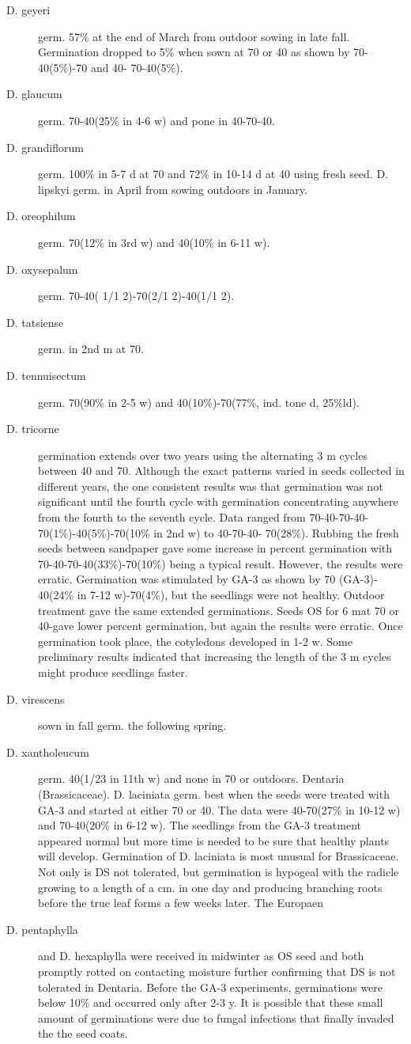 \begin{description}
\item[D. geyeri] germ. 57\% at the end of March from outdoor sowing in late fall.
Germination dropped to 5\% when sown at 70 or 40 as shown by 70-40(5\%)-70 and 40-
70-40(5\%).
\item[D. glaucum] germ. 70-40(25\% in 4-6 w) and pone in 40-70-40.
\item[D. grandiflorum] germ. 100\% in 5-7 d at 70 and 72\% in 10-14 d at 40 using fresh
seed. D. lipskyi germ. in April from sowing outdoors in January.
\item[D. oreophilum] germ. 70(12\% in 3rd w) and 40(10\% in 6-11 w).
\item[D. oxysepalum] germ. 70-40( 1/1 2)-70(2/1 2)-40(1/1 2).
\item[D. tatsiense] germ. in 2nd m at 70.
\item[D. tennuisectum] germ. 70(90\% in 2-5 w) and 40(10\%)-70(77\%, ind. tone d,
25\%ld).
\item[D. tricorne] germination extends over two years using the alternating 3 m cycles
between 40 and 70. Although the exact patterns varied in seeds collected in different
years, the one consistent results was that germination was not significant until the
fourth cycle with germination concentrating anywhere from the fourth to the seventh
cycle. Data ranged from 70-40-70-40-70(1\%)-40(5\%)-70(10\% in 2nd w) to 40-70-40-
70(28\%). Rubbing the fresh seeds between sandpaper gave some increase in
percent germination with 70-40-70-40(33\%)-70(10\%) being a typical result. However,
the results were erratic. Germination was stimulated by GA-3 as shown by 70 (GA-3)-
40(24\% in 7-12 w)-70(4\%), but the seedlings were not healthy. Outdoor treatment
gave the same extended germinations. Seeds OS for 6 mat 70 or 40-gave lower
percent germination, but again the results were erratic. Once germination took place,
the cotyledons developed in 1-2 w. Some preliminary results indicated that increasing
the length of the 3 m cycles might produce seedlings faster.
\item[D. virescens] sown in fall germ. the following spring.
\item[D. xantholeucum] germ. 40(1/23 in 11th w) and none in 70 or outdoors.
Dentaria (Brassicaceae). D. laciniata germ. best when the seeds were
treated with GA-3 and started at either 70 or 40. The data were 40-70(27\% in 10-12 w)
and 70-40(20\% in 6-12 w). The seedlings from the GA-3 treatment appeared normal
but more time is needed to be sure that healthy plants will develop. Germination of D.
laciniata is most unusual for Brassicaceae. Not only is DS not tolerated, but
germination is hypogeal with the radicle growing to a length of a cm. in one day and
producing branching roots before the true leaf forms a few weeks later. The Europaen
\item[D. pentaphylla] and D. hexaphylla were received in midwinter as OS seed and both
promptly rotted on contacting moisture further confirming that DS is not tolerated in
Dentaria. Before the GA-3 experiments, germinations were below 10\% and occurred
only after 2-3 y. It is possible that these small amount of germinations were due to
fungal infections that finally invaded the the seed coats.


\end{description}
